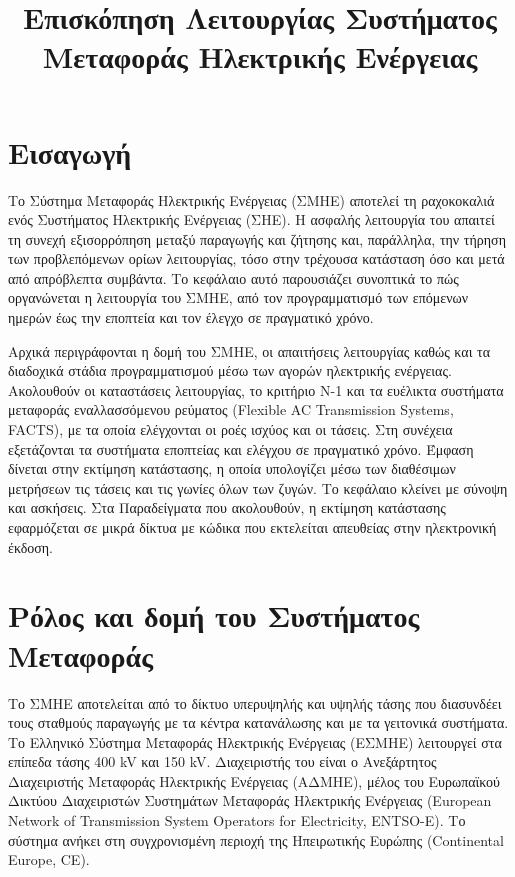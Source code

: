 \title{Επισκόπηση Λειτουργίας Συστήματος Μεταφοράς Ηλεκτρικής Ενέργειας}

\section{Εισαγωγή}
\label{kef-01-theoria}

Το Σύστημα Μεταφοράς Ηλεκτρικής Ενέργειας (ΣΜΗΕ) αποτελεί τη ραχοκοκαλιά ενός Συστήματος
Ηλεκτρικής Ενέργειας (ΣΗΕ). Η ασφαλής λειτουργία του απαιτεί τη συνεχή εξισορρόπηση μεταξύ
παραγωγής και ζήτησης και, παράλληλα, την τήρηση των προβλεπόμενων ορίων λειτουργίας, τόσο στην τρέχουσα κατάσταση όσο
και μετά από απρόβλεπτα συμβάντα. Το κεφάλαιο αυτό παρουσιάζει συνοπτικά το πώς οργανώνεται η
λειτουργία του ΣΜΗΕ, από τον προγραμματισμό των επόμενων ημερών έως την εποπτεία και τον
έλεγχο σε πραγματικό χρόνο.

Αρχικά περιγράφονται η δομή του ΣΜΗΕ, οι απαιτήσεις λειτουργίας καθώς και τα
διαδοχικά στάδια προγραμματισμού μέσω των αγορών ηλεκτρικής ενέργειας. Ακολουθούν οι
καταστάσεις λειτουργίας, το κριτήριο N-1 και τα ευέλικτα συστήματα μεταφοράς εναλλασσόμενου
ρεύματος (Flexible AC Transmission Systems, FACTS), με τα οποία ελέγχονται οι ροές ισχύος και
οι τάσεις. Στη συνέχεια εξετάζονται τα συστήματα εποπτείας και ελέγχου σε πραγματικό χρόνο.
Έμφαση δίνεται στην εκτίμηση κατάστασης, η οποία υπολογίζει μέσω των διαθέσιμων μετρήσεων τις
τάσεις και τις γωνίες όλων των ζυγών. Το κεφάλαιο κλείνει με σύνοψη και ασκήσεις. Στα
Παραδείγματα που ακολουθούν, η εκτίμηση κατάστασης εφαρμόζεται σε μικρά δίκτυα με κώδικα που
εκτελείται απευθείας στην ηλεκτρονική έκδοση.


\section{Ρόλος και δομή του Συστήματος Μεταφοράς}

Το ΣΜΗΕ αποτελείται από το δίκτυο υπερυψηλής και υψηλής τάσης που διασυνδέει τους σταθμούς παραγωγής με τα κέντρα κατανάλωσης και με τα γειτονικά
συστήματα. Το Ελληνικό Σύστημα Μεταφοράς Ηλεκτρικής Ενέργειας (ΕΣΜΗΕ) λειτουργεί στα επίπεδα
τάσης 400 kV και 150 kV. Διαχειριστής του είναι ο Ανεξάρτητος Διαχειριστής Μεταφοράς
Ηλεκτρικής Ενέργειας (ΑΔΜΗΕ), μέλος του Ευρωπαϊκού Δικτύου Διαχειριστών Συστημάτων Μεταφοράς
Ηλεκτρικής Ενέργειας (European Network of Transmission System
Operators for Electricity, ENTSO-E). Το σύστημα ανήκει στη
συγχρονισμένη περιοχή της Ηπειρωτικής Ευρώπης (Continental Europe, CE).

